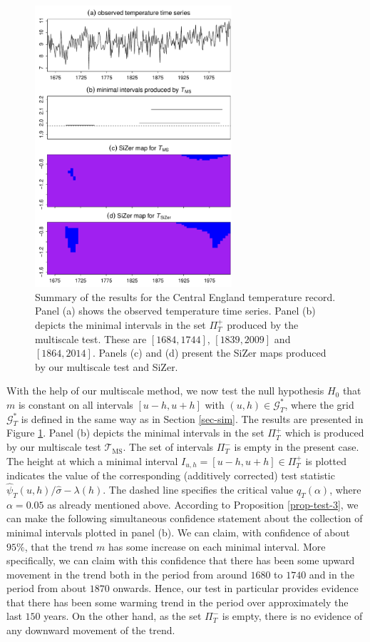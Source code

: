 \begin{figure}[t!]
\centering
\includegraphics[width=0.65\textwidth]{Plots/UK_temperature.pdf}
\caption{Summary of the results for the Central England temperature record. Panel (a) shows the observed temperature time series. Panel (b) depicts the minimal intervals in the set $\Pi_T^+$ produced by the multiscale test. These are $[1684,1744]$, $[1839,2009]$ and $[1864,2014]$. Panels (c) and (d) present the SiZer maps produced by our multiscale test and SiZer. }\label{fig:app:UK}
\end{figure}


With the help of our multiscale method, we now test the null hypothesis $H_0$ that $m$ is constant on all intervals $[u-h,u+h]$ with $(u,h) \in \mathcal{G}_T^*$, where the grid $\mathcal{G}_T^*$ is defined in the same way as in Section \ref{sec-sim}. The results are presented in Figure \ref{fig:app:UK}. Panel (b) depicts the minimal intervals in the set $\Pi_T^+$ which is produced by our multiscale test $\mathcal{T}_{\text{MS}}$. The set of intervals $\Pi_T^-$ is empty in the present case. The height at which a minimal interval $I_{u,h} = [u-h,u+h] \in \Pi_T^+$ is plotted indicates the value of the corresponding (additively corrected) test statistic $\widehat{\psi}_T(u,h) / \widehat{\sigma} - \lambda(h)$. The dashed line specifies the critical value $q_T(\alpha)$, where $\alpha = 0.05$ as already mentioned above. According to Proposition \ref{prop-test-3}, we can make the following simultaneous confidence statement about the collection of minimal intervals plotted in panel (b). We can claim, with confidence of about $95\%$, that the trend $m$ has some increase on each minimal interval. More specifically, we can claim with this confidence that there has been some upward movement in the trend both in the period from around $1680$ to $1740$ and in the period from about $1870$ onwards. Hence, our test in particular provides evidence that there has been some warming trend in the period over approximately the last $150$ years. On the other hand, as the set $\Pi_T^-$ is empty, there is no evidence of any downward movement of the trend.


